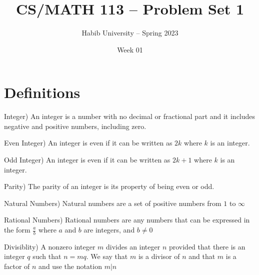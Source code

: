 \documentclass[10pt]{article}
\newenvironment{definition}[2][Definition]{\begin{trivlist}
    \item[\hskip \labelsep {\bfseries #1}\hskip \labelsep {\bfseries #2.}]}{\end{trivlist}}
\begin{document}
\title{CS/MATH 113 -- Problem Set 1}
\author{Habib University -- Spring 2023}
\date{Week 01}
\maketitle

\section{Definitions}


\begin{definition}{1}(Integer)
    An integer is a number with no decimal or fractional part and it includes negative and positive numbers, including zero.
\end{definition}


\begin{definition}{2}(Even Integer)
    An integer is even if it can be written as $2k$ where $k$ is an integer.
\end{definition}

\begin{definition}{3}(Odd Integer)
    An integer is even if it can be written as $2k+1$ where $k$ is an integer.
\end{definition}

\begin{definition}{4}(Parity)
    The parity of an integer is its property of being even or odd.
\end{definition}

\begin{definition}{5}(Natural Numbers)
    Natural numbers are a set of positive numbers from $1$ to $\infty$
\end{definition}

\begin{definition}{6}(Rational Numbers)
    Rational numbers are any numbers that can be expressed in the form $\frac{a}{b}$ where $a$ and $b$ are integers, and $b \neq  0$
\end{definition}

\begin{definition}{7}(Divisiblity)
    A nonzero integer $m$ divides an integer $n$ provided that there is an integer $q$ such that $n=mq$. We say that $m$ is a divisor of $n$
    and that $m$ is a factor of $n$ and use the notation $ m | n$
\end{definition}
\end{document}
